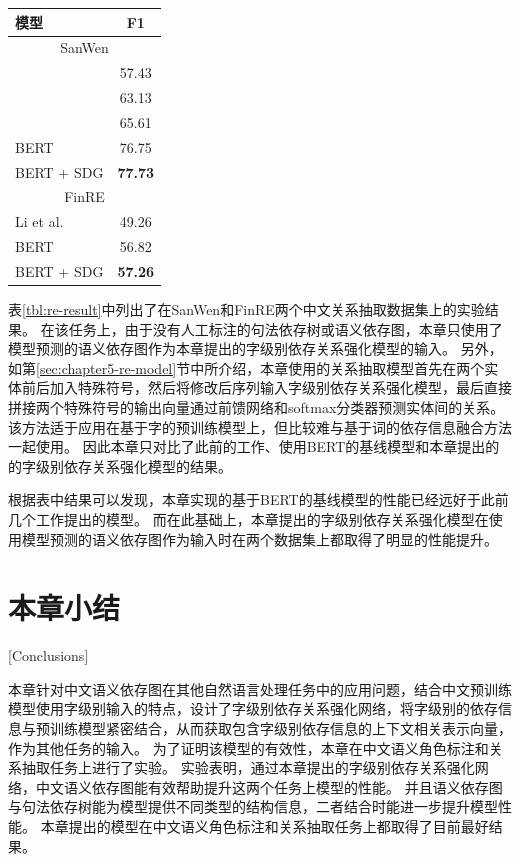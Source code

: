 \begin{table}[htpb]
    \vspace{0.5em}\centering\wuhao
    \begin{tabular}{lc}
        \toprule[1.5pt]
        模型 & F1 \\
        \midrule[1pt]
        \multicolumn{2}{c}{SanWen} \\
        \hline
        \citet{xu-etal-2020-chinese} & 57.43 \\
        \citet{zhang-yu-2020-chinese} & 63.13 \\
        \citet{li-etal-2019-chinese} & 65.61 \\
        BERT & 76.75 \\
        BERT + SDG & \bf 77.73 \\
        \hline
        \multicolumn{2}{c}{FinRE} \\
        \hline
        Li et al. & 49.26 \\
        BERT & 56.82 \\
        BERT + SDG & \bf 57.26 \\
        \bottomrule[1.5pt]
    \end{tabular}
\end{table}

表\ref{tbl:re-result}中列出了在SanWen和FinRE两个中文关系抽取数据集上的实验结果。
在该任务上，由于没有人工标注的句法依存树或语义依存图，本章只使用了模型预测的语义依存图作为本章提出的字级别依存关系强化模型的输入。
另外，如第\ref{sec:chapter5-re-model}节中所介绍，本章使用的关系抽取模型首先在两个实体前后加入特殊符号，然后将修改后序列输入字级别依存关系强化模型，最后直接拼接两个特殊符号的输出向量通过前馈网络和softmax分类器预测实体间的关系。
该方法适于应用在基于字的预训练模型上，但比较难与基于词的依存信息融合方法一起使用。
因此本章只对比了此前的工作、使用BERT的基线模型和本章提出的的字级别依存关系强化模型的结果。

根据表中结果可以发现，本章实现的基于BERT的基线模型的性能已经远好于此前几个工作提出的模型。
而在此基础上，本章提出的字级别依存关系强化模型在使用模型预测的语义依存图作为输入时在两个数据集上都取得了明显的性能提升。

\section{本章小结}[Conclusions]

本章针对中文语义依存图在其他自然语言处理任务中的应用问题，结合中文预训练模型使用字级别输入的特点，设计了字级别依存关系强化网络，将字级别的依存信息与预训练模型紧密结合，从而获取包含字级别依存信息的上下文相关表示向量，作为其他任务的输入。
为了证明该模型的有效性，本章在中文语义角色标注和关系抽取任务上进行了实验。
实验表明，通过本章提出的字级别依存关系强化网络，中文语义依存图能有效帮助提升这两个任务上模型的性能。
并且语义依存图与句法依存树能为模型提供不同类型的结构信息，二者结合时能进一步提升模型性能。
本章提出的模型在中文语义角色标注和关系抽取任务上都取得了目前最好结果。


